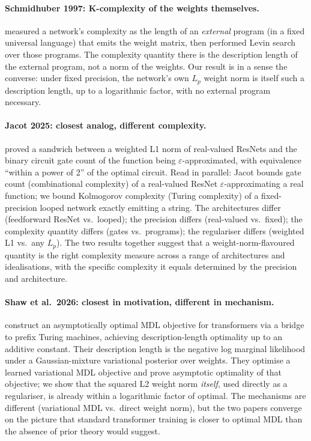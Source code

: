 \documentclass{article}
\theoremstyle{definition}
\newcommand{\eps}{\varepsilon}
\begin{document}
\paragraph{Schmidhuber 1997: K-complexity of the weights themselves.}
\citet{schmidhuber1997discovering} measured a network's complexity as the length of an \emph{external} program (in a fixed universal language) that emits the weight matrix, then performed Levin search over those programs. The complexity quantity there is the description length of the external program, not a norm of the weights. Our result is in a sense the converse: under fixed precision, the network's own $L_p$ weight norm is itself such a description length, up to a logarithmic factor, with no external program necessary.

\paragraph{Jacot 2025: closest analog, different complexity.}
\citet{jacot2025deep} proved a sandwich between a weighted L1 norm of real-valued ResNets and the binary circuit gate count of the function being $\eps$-approximated, with equivalence ``within a power of 2'' of the optimal circuit. Read in parallel: Jacot bounds gate count (combinational complexity) of a real-valued ResNet $\eps$-approximating a real function; we bound Kolmogorov complexity (Turing complexity) of a fixed-precision looped network exactly emitting a string. The architectures differ (feedforward ResNet vs.\ looped); the precision differs (real-valued vs.\ fixed); the complexity quantity differs (gates vs.\ programs); the regulariser differs (weighted L1 vs.\ any $L_p$). The two results together suggest that a weight-norm-flavoured quantity is the right complexity measure across a range of architectures and idealisations, with the specific complexity it equals determined by the precision and architecture.

\paragraph{Shaw et al.\ 2026: closest in motivation, different in mechanism.}
\citet{shaw2026bridging} construct an asymptotically optimal MDL objective for transformers via a bridge to prefix Turing machines, achieving description-length optimality up to an additive constant. Their description length is the negative log marginal likelihood under a Gaussian-mixture variational posterior over weights. They optimise a learned variational MDL objective and prove asymptotic optimality of that objective; we show that the squared L2 weight norm \emph{itself}, used directly as a regulariser, is already within a logarithmic factor of optimal. The mechanisms are different (variational MDL vs.\ direct weight norm), but the two papers converge on the picture that standard transformer training is closer to optimal MDL than the absence of prior theory would suggest.
\end{document}
